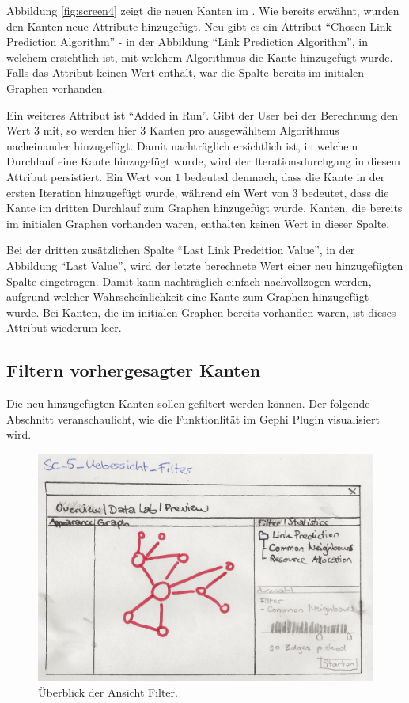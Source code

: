 Abbildung \ref{fig:screen4} zeigt die neuen Kanten im .
Wie bereits erwähnt, wurden den Kanten neue Attribute hinzugefügt.
Neu gibt es ein Attribut ``Chosen Link Prediction Algorithm'' - in der Abbildung ``Link Prediction Algorithm'', in welchem ersichtlich ist, mit welchem Algorithmus die Kante hinzugefügt wurde.
Falls das Attribut keinen Wert enthält, war die Spalte bereits im initialen Graphen vorhanden.

Ein weiteres Attribut ist ``Added in Run''. Gibt der User bei der Berechnung den Wert $3$ mit, so werden hier 3 Kanten pro
ausgewähltem Algorithmus nacheinander hinzugefügt. Damit nachträglich ersichtlich ist, in welchem Durchlauf eine
Kante hinzugefügt wurde, wird der Iterationsdurchgang in diesem Attribut persistiert.
Ein Wert von $1$ bedeuted demnach, dass die Kante in der ersten Iteration hinzugefügt wurde, während ein Wert von $3$ bedeutet, dass die Kante im dritten Durchlauf zum Graphen hinzugefügt wurde.
Kanten, die bereits im initialen Graphen vorhanden waren, enthalten keinen Wert in dieser Spalte.

Bei der dritten zusätzlichen Spalte ``Last Link Predcition Value'', in der Abbildung ``Last Value'', wird der letzte berechnete Wert einer neu hinzugefügten Spalte eingetragen.
Damit kann nachträglich einfach nachvollzogen werden, aufgrund welcher Wahrscheinlichkeit eine Kante zum Graphen hinzugefügt wurde.
Bei Kanten, die im initialen Graphen bereits vorhanden waren, ist dieses Attribut wiederum leer.

\subsection{Filtern vorhergesagter Kanten}

Die neu hinzugefügten Kanten sollen gefiltert werden können.
Der folgende Abschnitt veranschaulicht, wie die Funktionlität im Gephi Plugin visualisiert wird.

\begin{figure}
    \includegraphics[width=\linewidth]{resources/SC-5.png}
    \caption{Überblick der Ansicht Filter.}
    \label{fig:screen5}
\end{figure}

